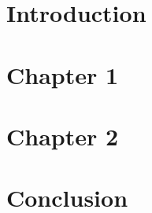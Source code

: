 \documentclass[11pt]{article}
\begin{document}
\renewcommand{\tablename}{Table}

\thispagestyle{empty}


\newpage
{}



\newpage


\tableofcontents
\newpage



\renewcommand{\listfigurename}{List of Figures}
\listoffigures
\newpage


\renewcommand{\listtablename}{List of Tables} 
\listoftables
\newpage



\section{Introduction}\label{sec:introduction}
  
  \newpage

 \section{Chapter 1}\label{sec:chap1}
   
   \newpage

 \section{Chapter 2}\label{sec:chap2}
   
   \newpage

   \section{Conclusion}\label{sec:chap2}
   
   \newpage

%

	
\end{document}
